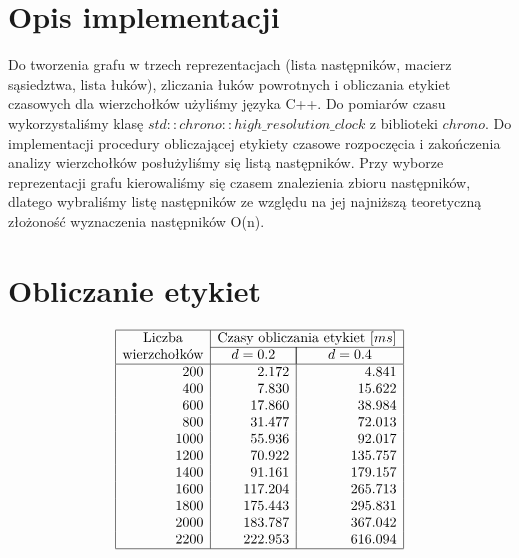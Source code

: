\documentclass[polish,polish,a4paper]{article}
\begin{document}
\begin{spacing}{1.25}

\section{Opis implementacji }

Do tworzenia grafu w trzech reprezentacjach (lista następników, macierz sąsiedztwa, lista łuków), zliczania łuków powrotnych i obliczania etykiet czasowych dla wierzchołków użyliśmy języka C++. Do pomiarów czasu wykorzystaliśmy klasę $std :: chrono :: high\_resolution\_clock$ z biblioteki $chrono$. Do implementacji procedury obliczającej etykiety czasowe rozpoczęcia i zakończenia analizy wierzchołków posłużyliśmy się listą następników. Przy wyborze reprezentacji grafu kierowaliśmy się czasem znalezienia zbioru następników, dlatego wybraliśmy listę następników ze względu na jej najniższą teoretyczną złożoność wyznaczenia następników O(n).  

\section{Obliczanie etykiet}

\begin{spacing}{1.5}
	\begin{equation*}
	\begin{array}{|r|r|r|}
	\hline
	\multicolumn{1}{|c|}{$Liczba$}&\multicolumn{2}{c|}{$Czasy obliczania etykiet $[ms]}\\\cline{2-3}
	\multicolumn{1}{|c|}{$wierzchołków$}&\multicolumn{1}{c|}{\quad d=0.2\quad}&\multicolumn{1}{|c|}{d=0.4}\\
	\hline
	200&2.172&4.841\\
	400&7.830&15.622\\
	600&17.860&38.984\\
	800&31.477&72.013\\
	1000&55.936&92.017\\
	1200&70.922&135.757\\
	1400&91.161&179.157\\
	1600&117.204&265.713\\
	1800&175.443&295.831\\
	2000&183.787&367.042\\
	2200&222.953&616.094\\
	\hline
	\end{array}
	\end{equation*}
\end{spacing}


\end{spacing}
\end{document}
